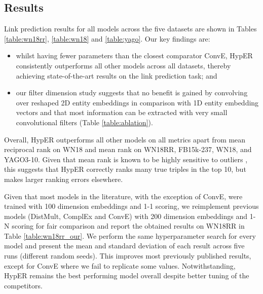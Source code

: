 \documentclass[runningheads]{llncs}
\begin{document}
\subsection{Results}
 Link prediction results for all models across the five datasets are shown in Tables \ref{table:wn18rr}, \ref{table:wn18} and \ref{table:yago}. Our key findings are:

\begin{itemize}
\item whilst having fewer parameters than the closest comparator ConvE, HypER consistently outperforms all other models across all datasets, thereby achieving state-of-the-art results on the link prediction task; and
\item our filter dimension study suggests that no benefit is gained by convolving over reshaped 2D entity embeddings in comparison with 1D entity embedding vectors and that most information can be extracted with very small convolutional filters (Table \ref{table:ablation}).
\end{itemize}

Overall, HypER outperforms all other models on all metrics apart from mean reciprocal rank on WN18 and mean rank on WN18RR, FB15k-237, WN18, and YAGO3-10. Given that mean rank is known to be highly sensitive to outliers \cite{nickel2016holographic}, this suggests that HypER correctly ranks many true triples in the top 10, but makes larger ranking errors elsewhere. 

Given that most models in the literature, with the exception of ConvE, were trained with 100 dimension embeddings and 1-1 scoring, we reimplement previous models (DistMult, ComplEx and ConvE) with 200 dimension embeddings and 1-N scoring for fair comparison and report the obtained results on WN18RR in Table \ref{table:wn18rr_our}. We perform the same hyperparameter search for every model and present the mean and standard deviation of each result across five runs (different random seeds). This improves most previously published results, except for ConvE where we fail to replicate some values. Notwithstanding, HypER remains the best performing model overall despite better tuning of the competitors.
\end{document}
